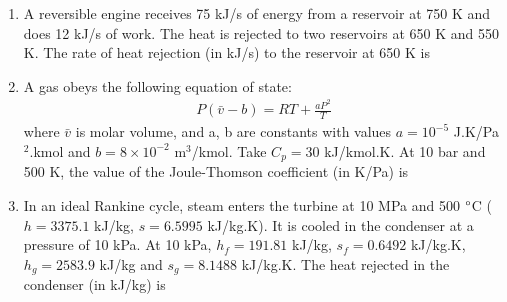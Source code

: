 \documentclass[a4paper,10pt]{article}
\begin{document}
\begin{enumerate}
    \item A reversible engine receives 75 kJ/s of energy from a reservoir at 750 K and does 12 kJ/s of work. The heat is rejected to two reservoirs at 650 K and 550 K. The rate of heat rejection (in kJ/s) to the reservoir at 650 K is
    \hfill{}
    \begin{enumerate}[label=\Alph*)]
    \end{enumerate}

    \item A gas obeys the following equation of state:
    \begin{align*}
        P(\bar{v}-b) = RT + \frac{aP^2}{T}
    \end{align*}
    where $\bar{v}$ is molar volume, and a, b are constants with values $a=10^{-5}$ J.K/Pa$^2$.kmol and $b=8 \times 10^{-2}$ m$^3$/kmol. Take $C_p = 30$ kJ/kmol.K. At 10 bar and 500 K, the value of the Joule-Thomson coefficient (in K/Pa) is
    \hfill{}
    \begin{enumerate}[label=\Alph*)]
    \end{enumerate}

    \item In an ideal Rankine cycle, steam enters the turbine at 10 MPa and 500 $\degree$C ($h = 3375.1$ kJ/kg, $s = 6.5995$ kJ/kg.K). It is cooled in the condenser at a pressure of 10 kPa. At 10 kPa, $h_f = 191.81$ kJ/kg, $s_f = 0.6492$ kJ/kg.K, $h_g = 2583.9$ kJ/kg and $s_g = 8.1488$ kJ/kg.K. The heat rejected in the condenser (in kJ/kg) is
    \hfill{}
    \begin{enumerate}[label=\Alph*)]
    \end{enumerate}


\end{enumerate}
\end{document}
